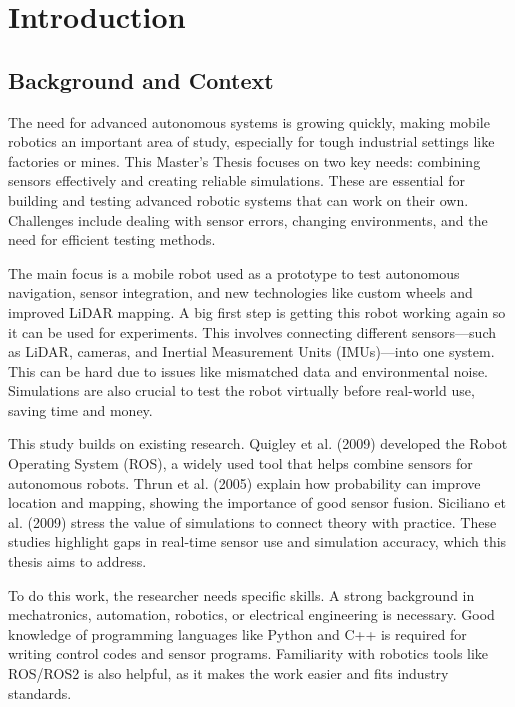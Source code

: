 
\chapter{Introduction}

\section{Background and Context}

The need for advanced autonomous systems is growing quickly, making mobile robotics
an important area of study, especially for tough industrial settings like factories
or mines. This Master's Thesis focuses on two key needs: combining sensors effectively
and creating reliable simulations. These are essential for building and testing
advanced robotic systems that can work on their own. Challenges include dealing with
sensor errors, changing environments, and the need for efficient testing methods.

The main focus is a mobile robot used as a prototype to test autonomous navigation,
sensor integration, and new technologies like custom wheels and improved LiDAR mapping.
A big first step is getting this robot working again so it can be used for experiments.
This involves connecting different sensors—such as LiDAR, cameras, and Inertial
Measurement Units (IMUs)—into one system. This can be hard due to issues like
mismatched data and environmental noise. Simulations are also crucial to test the
robot virtually before real-world use, saving time and money.

This study builds on existing research. Quigley et al. (2009) developed the Robot
Operating System (ROS), a widely used tool that helps combine sensors for autonomous
robots. Thrun et al. (2005) explain how probability can improve location and mapping,
showing the importance of good sensor fusion. Siciliano et al. (2009) stress the
value of simulations to connect theory with practice. These studies highlight gaps
in real-time sensor use and simulation accuracy, which this thesis aims to address.

To do this work, the researcher needs specific skills. A strong background in
mechatronics, automation, robotics, or electrical engineering is necessary. Good
knowledge of programming languages like Python and C++ is required for writing
control codes and sensor programs. Familiarity with robotics tools like ROS/ROS2
is also helpful, as it makes the work easier and fits industry standards.

